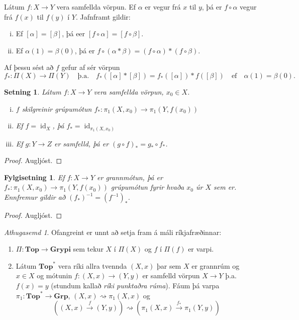 \documentclass[a4paper,icelandic]{book}
\theoremstyle{definition}
\theoremstyle{plain}
\newtheorem{setn}{Setning}[section]
\newtheorem{fylgisetn}{Fylgisetning}[section]
\theoremstyle{remark}
\newtheorem*{ath}{Athugasemd}
\DeclareMathOperator{\id}{id} %
\begin{document}
Látum $f:X\to Y$ vera samfellda vörpun. Ef $\alpha$ er vegur frá $x$ til
$y$, þá er $f\circ\alpha$ vegur frá $f(x)$ til $f(y)$ í $Y$. Jafnframt
gildir:
\begin{enumerate}[(i)]
  \item Ef $[\alpha] = [\beta]$, þá eer $[f\circ\alpha]=[f\circ\beta]$.
  \item Ef $\alpha(1) = \beta(0)$, þá er $f\circ(\alpha*\beta) =
    (f\circ\alpha)*(f\circ\beta)$. 
\end{enumerate}
Af þessu sést að $f$ gefur af sér vörpun\[
 f_* : \Pi(X)\to\Pi(Y) \quad\text{þ.a.}\quad
 f_*([\alpha]*[\beta]) = f_*([\alpha])*f([\beta])
 \quad\text{ef}\quad
 \alpha(1) = \beta(0).
\]
\begin{setn}
  Látum $f:X\to Y$ vera samfellda vörpun, $x_0\in X$. 
  \begin{enumerate}[(i)]
    \item $f$ skilgreinir grúpumótun $f_*:\pi_1(X,x_0)\to\pi_1(Y,f(x_0))$
    \item Ef $f=\id_X$, þá $f_* = \id_{\pi_1(X,x_0)}$
    \item Ef $g:Y\to Z$ er samfelld, þá er $(g\circ f)_* = g_*\circ
      f_*$. 
  \end{enumerate}
\end{setn}
\begin{proof}
  Augljóst.
\end{proof}
\begin{fylgisetn}
  Ef $f:X\to Y$ er grannmótun, þá er
  $f_*:\pi_1(X,x_0)\to\pi_1(Y,f(x_0))$ grúpumótun fyrir hvaða $x_0$ úr
  $X$ sem er. Ennfremur gildir að $(f_*)^{-1} = (f^{-1})_*$.
\end{fylgisetn}
\begin{proof}
  Augljóst.
\end{proof}
\begin{ath}
  Ofangreint er unnt að setja fram á máli ríkjafræðinnar:
  \begin{enumerate}[(1)]
    \item $\Pi:\mathbf{Top}\to\mathbf{Grypi}$ sem tekur $X$ í $\Pi(X)$
      og $f$ í $\Pi(f)$ er varpi.
    \item Látum $\mathbf{Top}^*$ vera ríki allra tvennda $(X,x)$ þar sem
      $X$ er grannrúm og $x\in X$ og mótunin $f:(X,x)\to(Y,y)$ er
      samfelld vörpun $X\to Y$ þ.a. $f(x) = y$ (stundum kallað
      \emph{ríki punktaðra rúma}). Fáum þá varpa
      $\pi_1:\mathbf{Top}^*\to\mathbf{Grp}$,
      $(X,x)\rightsquigarrow\pi_1(X,x)$ og \[
      ( (X,x)\xrightarrow{f}(Y,y))
      \rightsquigarrow
      (\pi_1(X,x)\xrightarrow{f_*}\pi_1(Y,y))
      \]
  \end{enumerate}
\end{ath}
\end{document}
